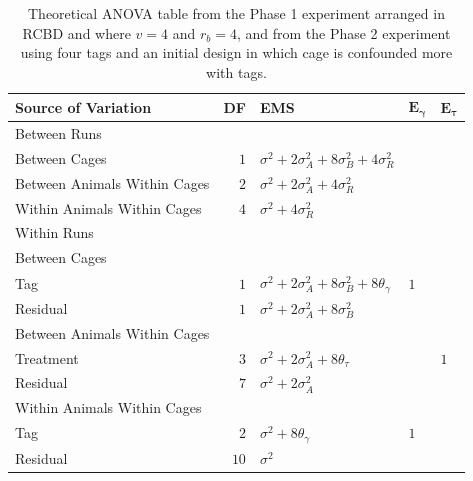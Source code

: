 \documentclass[12pt,a4paper]{article}
\begin{document}
\begin{table}[ht]
\centering
 \caption{Theoretical ANOVA table from the Phase 1 experiment arranged in RCBD and where $v = 4$ and $r_b = 4$, and from the Phase 2 experiment using four tags and an initial design in which cage is confounded more with tags.}
 \begin{tabular}[t]{lrlll} 
 \toprule 
 \multicolumn{1}{l}{\textbf{Source of Variation}} & \multicolumn{1}{l}{\textbf{DF}} & \multicolumn{1}{l}{\textbf{EMS}}& \multicolumn{1}{l}{$\bm{E_{\gamma}}$}&\multicolumn{1}{l}{$\bm{E_{\tau}}$}\\ 
 \midrule 
 Between Runs &  &  & & \\ 
 \quad Between Cages & $1$ & $\sigma^2+2\sigma_{A}^2+8\sigma_{B}^2+4\sigma_{R}^2$ & & \\  
 \quad Between Animals Within Cages & $2$ & $\sigma^2+2\sigma_{A}^2+4\sigma_{R}^2$ & & \\  
 \quad Within Animals Within Cages & $4$ & $\sigma^2+4\sigma_{R}^2$ & & \\ \hline 
 Within Runs &  &  & & \\ 
 \quad Between Cages &  &  & & \\ 
 \quad \quad Tag & $1$ & $\sigma^2+2\sigma_{A}^2+8\sigma_{B}^2+8\theta_{\gamma}$ &$1$ & \\ 
 \quad \quad Residual & $1$ & $\sigma^2+2\sigma_{A}^2+8\sigma_{B}^2$ & & \\ \hline 
 \quad Between Animals Within Cages &  &  & & \\ 
 \quad \quad Treatment & $3$ & $\sigma^2+2\sigma_{A}^2+8\theta_{\tau}$ & & $1$\\ 
 \quad \quad Residual & $7$ & $\sigma^2+2\sigma_{A}^2$ & & \\ \hline 
 \quad Within Animals Within Cages &  &  & & \\ 
 \quad \quad Tag & $2$ & $\sigma^2+8\theta_{\gamma}$ &$1$ & \\ 
 \quad \quad Residual & $10$ & $\sigma^2$ & & \\ 
 \bottomrule 
 \end{tabular} 
 \label{tab:ANOVAPhase1RCBD2} 
\end{table} 
\end{document}
